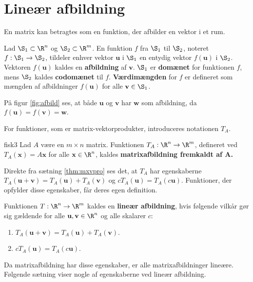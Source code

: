 \section{Lineær afbildning}
%
En matrix kan betragtes som en funktion, der afbilder en vektor i et rum.
%
\begin{defn}{}{}
Lad $\S _1 \subset \R^n$ og $\S _2 \subset \R^m$.
En funktion $f$ fra $\S_1$ til $\S_2$, noteret $f:\S_1\rightarrow\S_2$, tildeler enhver vektor $\textbf{u}$ i $\S_1$ en entydig vektor $f(\textbf{u})$ i $\S_2$.
Vektoren $f(\textbf{u})$ kaldes en \textbf{afbildning} af $\textbf{v}$.
$\S_1$ er \textbf{domænet} for funktionen $f$, mens $\S_2$ kaldes \textbf{codomænet} til $f$.
\textbf{Værdimængden} for $f$ er defineret som mængden af afbildninger $f(\textbf{u})$ for alle $\textbf{v}\in \S_1$.
\end{defn}\noindent
%
På figur \ref{fig:afbild} ses, at både $\textbf{u}$ og $\textbf{v}$ har $\textbf{w}$ som afbildning, da $f(\textbf{u})=f(\textbf{v})=\textbf{w}$.
%
%

%
For funktioner, som er matrix-vektorprodukter, introduceres notationen $T_A$.
%
\begin{defn}{}{fisk3}
Lad $A$ være en $m \times n$ matrix.
Funktionen $T_A:\R^n \rightarrow \R^m$, defineret ved $T_A(\textbf{x}) = A\textbf{x}$ for alle $\textbf{x} \in \R^n$, kaldes \textbf{matrixafbildning fremkaldt af $\mathbf{A}$.}
\end{defn}\noindent
%
Direkte fra sætning \ref{thm:mxvpro} ses det, at $T_A$ har egenskaberne $T_A(\textbf{u}+\textbf{v})=T_A(\textbf{u}) + T_A(\textbf{v})$ og $cT_A(\textbf{u}) = T_A(c\textbf{u})$.
Funktioner, der opfylder disse egenskaber, får deres egen definition.
%
\begin{defn}{}{}
Funktionen $T: \R^n \rightarrow \R^m$ kaldes en \textbf{lineær afbildning}, hvis følgende vilkår gør sig gældende for alle $\textbf{u},\textbf{v} \in \R^n$ og alle skalarer $c$:
\begin{enumerate}[label=(\alph*)]
\item $T_A(\textbf{u}+\textbf{v})=T_A(\textbf{u}) + T_A(\textbf{v})$.
\item $cT_A(\textbf{u}) = T_A(c\textbf{u})$.
\end{enumerate}
\end{defn}\noindent
%
Da matrixafbildning har disse egenskaber, er alle matrixafbildninger lineære.
Følgende sætning viser nogle af egenskaberne ved lineær afbildning.
